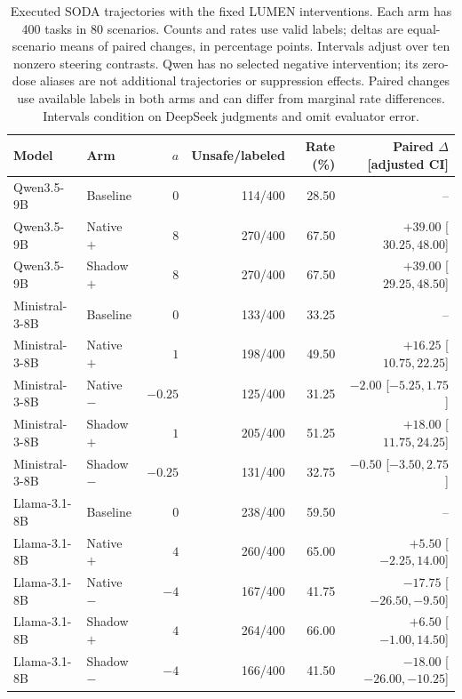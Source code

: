 \begin{table}[t]
\centering\footnotesize\setlength{\tabcolsep}{3pt}
\begin{tabular}{llrrrr}
\toprule
Model & Arm & $a$ & Unsafe/labeled & Rate (\%) & Paired $\Delta$ [adjusted CI] \\
\midrule
Qwen3.5-9B & Baseline & $0$ & 114/400 & 28.50 & -- \\
Qwen3.5-9B & Native $+$ & $8$ & 270/400 & 67.50 & $+39.00$ [$ 30.25, 48.00 $] \\
Qwen3.5-9B & Shadow $+$ & $8$ & 270/400 & 67.50 & $+39.00$ [$ 29.25, 48.50 $] \\
\midrule
Ministral-3-8B & Baseline & $0$ & 133/400 & 33.25 & -- \\
Ministral-3-8B & Native $+$ & $1$ & 198/400 & 49.50 & $+16.25$ [$ 10.75, 22.25 $] \\
Ministral-3-8B & Native $-$ & $-0.25$ & 125/400 & 31.25 & $-2.00$ [$ -5.25, 1.75 $] \\
Ministral-3-8B & Shadow $+$ & $1$ & 205/400 & 51.25 & $+18.00$ [$ 11.75, 24.25 $] \\
Ministral-3-8B & Shadow $-$ & $-0.25$ & 131/400 & 32.75 & $-0.50$ [$ -3.50, 2.75 $] \\
\midrule
Llama-3.1-8B & Baseline & $0$ & 238/400 & 59.50 & -- \\
Llama-3.1-8B & Native $+$ & $4$ & 260/400 & 65.00 & $+5.50$ [$ -2.25, 14.00 $] \\
Llama-3.1-8B & Native $-$ & $-4$ & 167/400 & 41.75 & $-17.75$ [$ -26.50, -9.50 $] \\
Llama-3.1-8B & Shadow $+$ & $4$ & 264/400 & 66.00 & $+6.50$ [$ -1.00, 14.50 $] \\
Llama-3.1-8B & Shadow $-$ & $-4$ & 166/400 & 41.50 & $-18.00$ [$ -26.00, -10.25 $] \\
\bottomrule
\end{tabular}
\caption{Executed SODA trajectories with the fixed LUMEN interventions. Each arm has 400 tasks in 80 scenarios. Counts and rates use valid labels; deltas are equal-scenario means of paired changes, in percentage points. Intervals adjust over ten nonzero steering contrasts. Qwen has no selected negative intervention; its zero-dose aliases are not additional trajectories or suppression effects. Paired changes use available labels in both arms and can differ from marginal rate differences. Intervals condition on DeepSeek judgments and omit evaluator error.}
\label{tab:current-soda}
\end{table}
